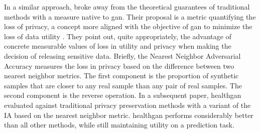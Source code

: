             In a similar approach, \citeauthor{Yale_2020} broke away from the theoretical guarantees of traditional methods with a measure native to \gls{gan}. Their proposal is a metric quantifying the loss of privacy, a concept more aligned with the objective of \gls{gan} to minimize the loss of data utility \cite{yale:hal-02160496,p2019}. They point out, quite appropriately, the advantage of concrete measurable values of loss in utility and privacy when making the decision of releasing sensitive data. Briefly, the Nearest Neighbor Adversarial Accuracy measures the loss in privacy based on the difference between two nearest neighbor metrics. The  first component is the proportion of synthetic samples that are closer to any real sample than any pair of real samples. The second component is the reverse operation. In a subsequent paper, \gls{healthgan} evaluated against traditional privacy preservation methods with a variant of the IA based on the nearest neighbor metric. \gls{healthgan} performs considerably better than all other methods, while still maintaining utility on a prediction task.


       



